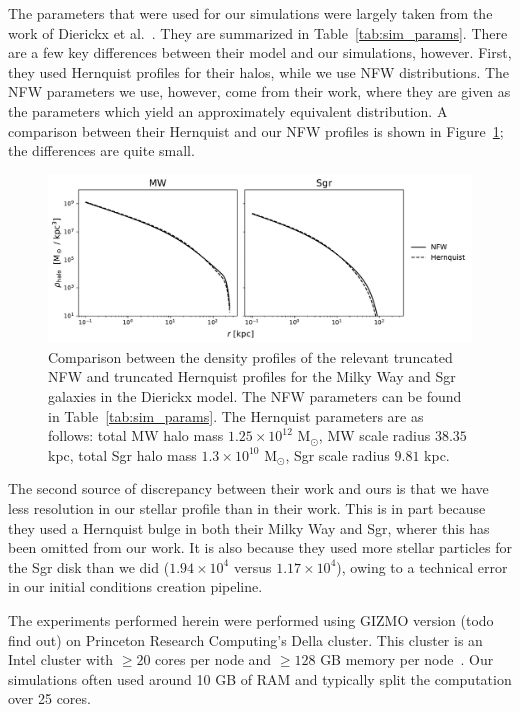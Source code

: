 The parameters that were used for our simulations were largely taken from the
work of Dierickx et al.~\cite{dierickx_predicted_2017}. They are summarized in
Table~\ref{tab:sim_params}. There are a few key differences between their model
and our simulations, however. First, they used Hernquist profiles for their
halos, while we use NFW distributions. The NFW parameters we use, however, come
from their work, where they are given as the parameters which yield an
approximately equivalent distribution. A comparison between their Hernquist
and our NFW profiles is shown in Figure~\ref{fig:nfw_vs_hernquist}; the
differences are quite small.

\begin{figure}
    \centering
    \includegraphics[width=0.9\linewidth]{figs/nfw_vs_hernquist.pdf}
    \caption{%
        Comparison between the density profiles of the relevant truncated NFW
        and truncated Hernquist profiles for the Milky Way and Sgr galaxies in
        the Dierickx model. The NFW parameters can be found in
        Table~\ref{tab:sim_params}. The Hernquist parameters are as follows:
        total MW halo mass $1.25 \times 10^{12}$ M$_\odot$, MW scale radius
        $38.35$ kpc, total Sgr halo mass $1.3 \times 10^{10}$ M$_\odot$, Sgr
        scale radius $9.81$ kpc.
    }
    \label{fig:nfw_vs_hernquist}
\end{figure}

The second source of discrepancy between their work and ours is that we have
less resolution in our stellar profile than in their work. This is in part
because they used a Hernquist bulge in both their Milky Way and Sgr, wherer this
has been omitted from our work. It is also because they used more stellar
particles for the Sgr disk than we did ($1.94 \times 10^4$ versus $1.17 \times
10^4$), owing to a technical error in our initial conditions creation
pipeline.

The experiments performed herein were performed using GIZMO version
(todo find out) on Princeton Research Computing's Della cluster. This
cluster is an Intel cluster with $\geq 20$ cores per node and $\geq
128$ GB memory per node~\cite{princeton_research_computing_della_nodate}. Our
simulations often used around 10 GB of RAM and typically split the computation
over 25 cores.

